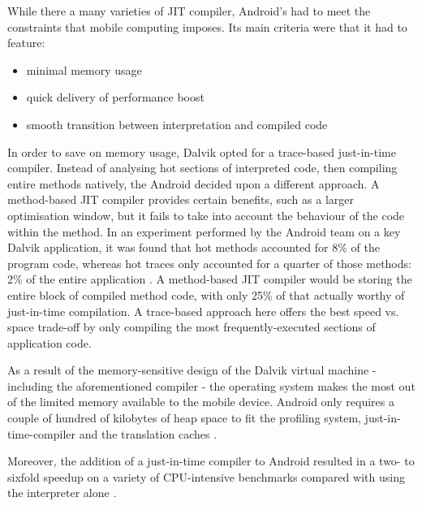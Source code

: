 While there a many varieties of JIT compiler, Android's had to meet the constraints that mobile computing imposes. Its main criteria were that it had to feature:

\begin{itemize}
    \item minimal memory usage
    \item quick delivery of performance boost
    \item smooth transition between interpretation and compiled code
\end{itemize}

In order to save on memory usage, Dalvik opted for a trace-based just-in-time compiler. Instead of analysing hot sections of interpreted code, then compiling entire methods natively, the Android decided upon a different approach. A method-based JIT compiler provides certain benefits, such as a larger optimisation window, but it fails to take into account the behaviour of the code within the method. In an experiment performed by the Android team on a key Dalvik application, it was found that hot methods accounted for 8\% of the program code, whereas hot traces only accounted for a quarter of those methods: 2\% of the entire application \cite{android_22}. A method-based JIT compiler would be storing the entire block of compiled method code, with only 25\% of that actually worthy of just-in-time compilation. A trace-based approach here offers the best speed vs. space trade-off by only compiling the most frequently-executed sections of application code.

As a result of the memory-sensitive design of the Dalvik virtual machine - including the aforementioned compiler - the operating system makes the most out of the limited memory available to the mobile device. Android only requires a couple of hundred of kilobytes of heap space to fit the profiling system, just-in-time-compiler and the translation caches \cite{android_22}.

Moreover, the addition of a just-in-time compiler to Android resulted in a two- to sixfold speedup on a variety of CPU-intensive benchmarks compared with using the interpreter alone \cite{android_22}.
